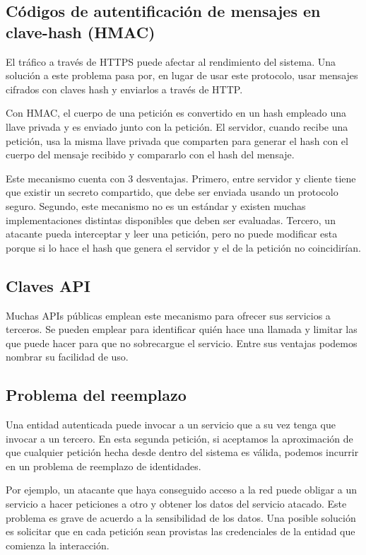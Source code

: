 \documentclass[11pt,a4paper]{article}
\begin{document}
\subsection{Códigos de autentificación de mensajes en clave-hash (HMAC)}

El tráfico a través de HTTPS puede afectar al rendimiento del sistema. Una solución a este problema pasa por, en lugar de usar este protocolo, usar mensajes cifrados con claves hash y enviarlos a través de HTTP.

Con HMAC, el cuerpo de una petición es convertido en un hash empleado una llave privada y es enviado junto con la petición. El servidor, cuando recibe una petición, usa la misma llave privada que comparten para generar el hash con el cuerpo del mensaje recibido y compararlo con el hash del mensaje. 

Este mecanismo cuenta con 3 desventajas. Primero, entre servidor y cliente tiene que existir un secreto compartido, que debe ser enviada usando un protocolo seguro. Segundo, este mecanismo no es un estándar y existen muchas implementaciones distintas disponibles que deben ser evaluadas. Tercero, un atacante pueda interceptar y leer una petición, pero no puede modificar esta porque si lo hace el hash que genera el servidor y el de la petición no coincidirían.

\subsection{Claves API}

Muchas APIs públicas emplean este mecanismo para ofrecer sus servicios a terceros. Se pueden emplear para identificar quién hace una llamada y limitar las que puede hacer para que no sobrecargue el servicio. Entre sus ventajas podemos nombrar su facilidad de uso.

\subsection{Problema del reemplazo}

Una entidad autenticada puede invocar a un servicio que a su vez tenga que invocar a un tercero. En esta segunda petición, si aceptamos la aproximación de que cualquier petición hecha desde dentro del sistema es válida, podemos incurrir en un problema de reemplazo de identidades. 

Por ejemplo, un atacante que haya conseguido acceso a la red puede obligar a un servicio a hacer peticiones a otro y obtener los datos del servicio atacado. Este problema es grave de acuerdo a la sensibilidad de los datos. Una posible solución es solicitar que en cada petición sean provistas las credenciales de la entidad que comienza la interacción.
\end{document}
